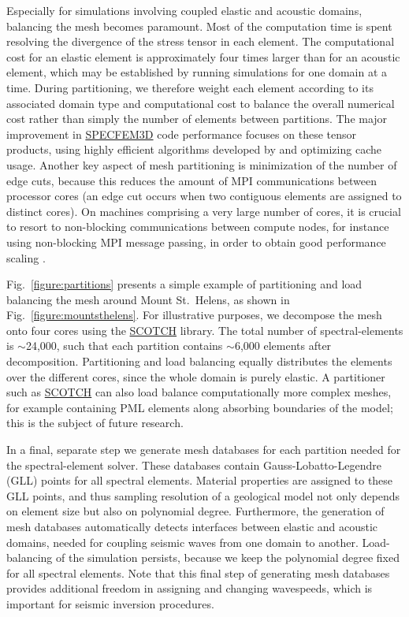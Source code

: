 \documentclass[referee,extra]{gji}
\begin{document}
Especially for simulations involving coupled elastic and acoustic domains,
balancing the mesh becomes paramount.
Most of the computation time is spent resolving the divergence of the stress tensor in each element.
The computational cost for an elastic element is approximately four times larger than for an acoustic element,
which may be established by running simulations for  one domain at a time.
During partitioning, we therefore weight each element according to its associated domain type and computational cost
to balance the overall numerical cost rather than simply the number of elements between partitions.
The major improvement in \href{http://www.geodynamics.org/cig/software/specfem3d}{SPECFEM3D} code performance focuses on these tensor products, using highly efficient algorithms developed by \citet{DeFiMu02} and optimizing cache usage.
Another key aspect of mesh partitioning is minimization of the number of edge cuts,
because this reduces the amount of MPI communications
between processor cores (an edge cut occurs when two contiguous elements are assigned to distinct cores).
On machines comprising a very large number of cores,
it is crucial to resort to non-blocking communications between compute nodes,
for instance using non-blocking MPI message passing, in order to obtain good performance scaling
\citep{DaNa98,MaKoBlLe08,KoLaMi08a}.

Fig.~\ref{figure:partitions}
presents a simple example of partitioning and load balancing the mesh
around Mount St.~Helens, as shown in Fig.~\ref{figure:mountsthelens}.
For illustrative purposes,
we decompose the mesh onto four cores using the \href{http://www.labri.fr/perso/pelegrin/scotch/}{SCOTCH} library.
The total number of spectral-elements is $\sim$24,000,
such that each partition contains $\sim$6,000 elements after decomposition.
Partitioning and load balancing equally distributes the elements over the different cores,
since the whole domain is purely elastic.
A partitioner such as \href{http://www.labri.fr/perso/pelegrin/scotch/}{SCOTCH}
can also load balance computationally more complex meshes,
for example containing PML elements
along absorbing boundaries of the model; this is the subject of future research.

In a final, separate step we generate mesh databases for each partition needed for the spectral-element solver.
These databases contain Gauss-Lobatto-Legendre (GLL) points for all spectral elements.
Material properties are assigned to these GLL points,
and thus sampling resolution of a geological model not only depends on element size but also on polynomial degree.
Furthermore, the generation of mesh databases automatically detects interfaces between elastic and acoustic domains,
needed for coupling seismic waves from one domain to another.
Load-balancing of the simulation persists, because we keep the polynomial degree fixed for all spectral elements.
Note that this final step of generating mesh databases provides additional freedom in assigning and changing wavespeeds,
which is important for seismic inversion procedures.
\end{document}
